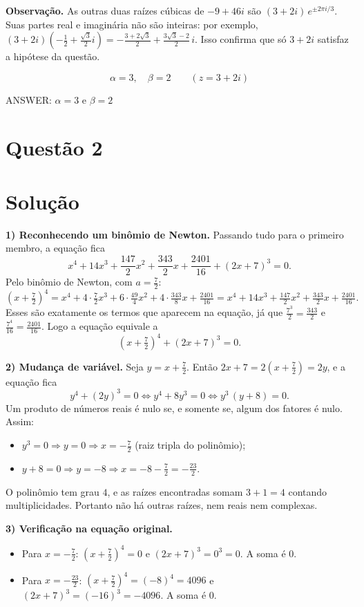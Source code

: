 \documentclass{article}%
\begin{document}
\textbf{Observação.} As outras duas raízes cúbicas de $-9+46i$ são $(3+2i)\,e^{\pm 2\pi i/3}$. Suas partes real e imaginária não são inteiras: por exemplo, $(3+2i)\left(-\tfrac12+\tfrac{\sqrt3}{2}i\right)=-\tfrac{3+2\sqrt3}{2}+\tfrac{3\sqrt3-2}{2}\,i$. Isso confirma que só $3+2i$ satisfaz a hipótese da questão.

\[
\boxed{\alpha=3,\quad \beta=2}\qquad (z=3+2i)
\]

ANSWER: $\alpha=3$ e $\beta=2$%
\newpage%
\section*{Questão 2}

\section*{Solução}

\textbf{1) Reconhecendo um binômio de Newton.} Passando tudo para o primeiro membro, a equação fica
\[
x^4+14x^3+\frac{147}{2}x^2+\frac{343}{2}x+\frac{2401}{16}+(2x+7)^3=0 .
\]
Pelo binômio de Newton, com $a=\frac{7}{2}$:
\[
\left(x+\tfrac{7}{2}\right)^4
= x^4+4\cdot\tfrac{7}{2}x^3+6\cdot\tfrac{49}{4}x^2+4\cdot\tfrac{343}{8}x+\tfrac{2401}{16}
= x^4+14x^3+\tfrac{147}{2}x^2+\tfrac{343}{2}x+\tfrac{2401}{16}.
\]
Esses são exatamente os termos que aparecem na equação, já que $\frac{7^3}{2}=\frac{343}{2}$ e $\frac{7^4}{16}=\frac{2401}{16}$. Logo a equação equivale a
\[
\left(x+\tfrac{7}{2}\right)^4+(2x+7)^3=0 .
\]

\textbf{2) Mudança de variável.} Seja $y=x+\frac{7}{2}$. Então $2x+7=2\left(x+\frac{7}{2}\right)=2y$, e a equação fica
\[
y^4+(2y)^3=0 \iff y^4+8y^3=0 \iff y^3\,(y+8)=0 .
\]
Um produto de números reais é nulo se, e somente se, algum dos fatores é nulo. Assim:
\begin{itemize}
\item $y^3=0 \Rightarrow y=0 \Rightarrow x=-\frac{7}{2}$ (raiz tripla do polinômio);
\item $y+8=0 \Rightarrow y=-8 \Rightarrow x=-8-\frac{7}{2}=-\frac{23}{2}$.
\end{itemize}
O polinômio tem grau $4$, e as raízes encontradas somam $3+1=4$ contando multiplicidades. Portanto não há outras raízes, nem reais nem complexas.

\textbf{3) Verificação na equação original.}
\begin{itemize}
\item Para $x=-\frac{7}{2}$: $\left(x+\frac{7}{2}\right)^4=0$ e $(2x+7)^3=0^3=0$. A soma é $0$. \checkmark
\item Para $x=-\frac{23}{2}$: $\left(x+\frac{7}{2}\right)^4=(-8)^4=4096$ e $(2x+7)^3=(-16)^3=-4096$. A soma é $0$. \checkmark
\end{itemize}
\end{document}
